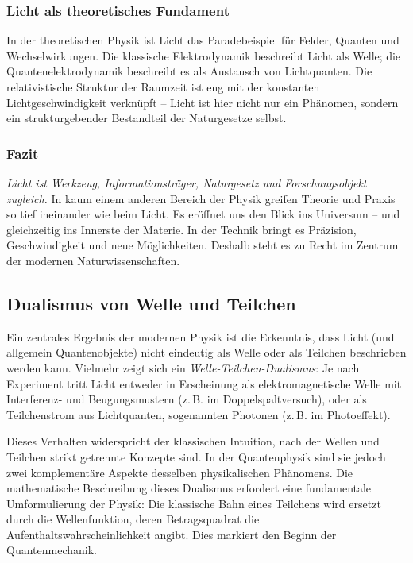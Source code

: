 \subsubsection*{Licht als theoretisches Fundament}
In der theoretischen Physik ist Licht das Paradebeispiel für Felder, Quanten und Wechselwirkungen. Die klassische Elektrodynamik beschreibt Licht als Welle; die Quantenelektrodynamik beschreibt es als Austausch von Lichtquanten. Die relativistische Struktur der Raumzeit ist eng mit der konstanten Lichtgeschwindigkeit verknüpft – Licht ist hier nicht nur ein Phänomen, sondern ein strukturgebender Bestandteil der Naturgesetze selbst.

\subsubsection{Fazit}
\emph{Licht ist Werkzeug, Informationsträger, Naturgesetz und Forschungsobjekt zugleich.} In kaum einem anderen Bereich der Physik greifen Theorie und Praxis so tief ineinander wie beim Licht. Es eröffnet uns den Blick ins Universum – und gleichzeitig ins Innerste der Materie. In der Technik bringt es Präzision, Geschwindigkeit und neue Möglichkeiten. Deshalb steht es zu Recht im Zentrum der modernen Naturwissenschaften.

\subsection{Dualismus von Welle und Teilchen}

Ein zentrales Ergebnis der modernen Physik ist die Erkenntnis, dass Licht (und allgemein Quantenobjekte) nicht eindeutig als Welle oder als Teilchen beschrieben werden kann. Vielmehr zeigt sich ein \emph{Welle-Teilchen-Dualismus}: Je nach Experiment tritt Licht entweder in Erscheinung als elektromagnetische Welle mit Interferenz- und Beugungsmustern (z.\,B. im Doppelspaltversuch), oder als Teilchenstrom aus Lichtquanten, sogenannten Photonen (z.\,B. im Photoeffekt).

Dieses Verhalten widerspricht der klassischen Intuition, nach der Wellen und Teilchen strikt getrennte Konzepte sind. In der Quantenphysik sind sie jedoch zwei komplementäre Aspekte desselben physikalischen Phänomens. Die mathematische Beschreibung dieses Dualismus erfordert eine fundamentale Umformulierung der Physik: Die klassische Bahn eines Teilchens wird ersetzt durch die Wellenfunktion, deren Betragsquadrat die Aufenthaltswahrscheinlichkeit angibt. Dies markiert den Beginn der Quantenmechanik.

